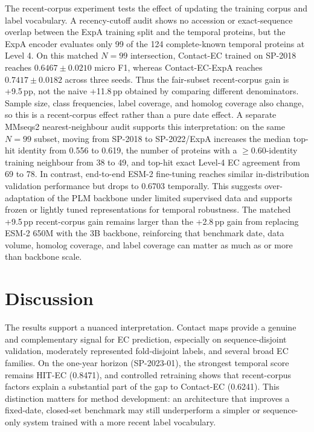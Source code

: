\documentclass[namedate,contemporary,mediumone]{oup-authoring-template}
\begin{document}
The recent-corpus experiment tests the effect of updating the training corpus and
label vocabulary. A recency-cutoff audit shows no accession or exact-sequence
overlap between the ExpA training split and the temporal proteins, but the ExpA
encoder evaluates only 99 of the 124 complete-known temporal proteins at Level 4.
On this matched $N=99$ intersection, Contact-EC trained on SP-2018 reaches
$0.6467\pm0.0210$ micro F1, whereas Contact-EC-ExpA reaches
$0.7417\pm0.0182$ across three seeds. Thus the fair-subset recent-corpus gain is
+9.5\,pp, not the naive +11.8\,pp obtained by
comparing different denominators. Sample size, class frequencies, label
coverage, and homolog coverage also change, so this is a recent-corpus effect
rather than a pure date effect. A separate MMseqs2 nearest-neighbour audit
supports this interpretation: on the same $N=99$ subset, moving from SP-2018 to
SP-2022/ExpA increases the median top-hit identity from 0.556 to 0.619, the
number of proteins with a $\geq0.60$-identity training neighbour from 38 to 49,
and top-hit exact Level-4 EC agreement from 69 to 78. In contrast,
end-to-end ESM-2 fine-tuning reaches similar in-distribution validation performance
but drops to 0.6703 temporally. This suggests over-adaptation of the PLM backbone
under limited supervised data and supports frozen or lightly tuned representations
for temporal robustness. The matched +9.5\,pp recent-corpus gain remains larger
than the +2.8\,pp gain from replacing ESM-2 650M with the 3B backbone,
reinforcing that benchmark date, data volume, homolog coverage, and label
coverage can matter as much as or more than backbone scale.

\section{Discussion}

The results support a nuanced interpretation. Contact maps provide a genuine
and complementary signal for EC prediction, especially on sequence-disjoint
validation, moderately represented fold-disjoint labels, and several broad EC
families. On the one-year horizon (SP-2023-01), the strongest temporal score
remains HIT-EC (0.8471), and controlled retraining shows that recent-corpus
factors explain a substantial part of the gap to Contact-EC (0.6241). This
distinction matters for method development: an architecture that improves a
fixed-date, closed-set benchmark may still underperform a simpler or sequence-only
system trained with a more recent label vocabulary.
\end{document}
